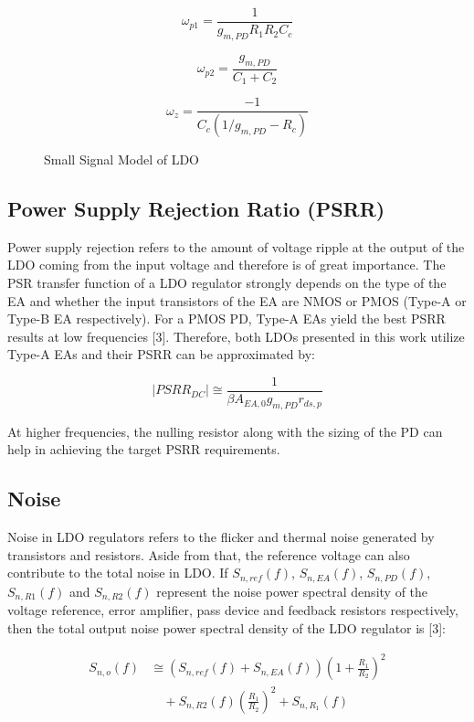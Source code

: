 \documentclass[journal]{IEEEtran}
\newcommand{\svg}[3]{
    \begin{figure}[!h]
        \centering
        
        \caption{#2}
    \end{figure}
}
\begin{document}
\begin{equation}
    \omega_{p1} = \frac{1}{g_{m,PD} R_1 R_2 C_c}
\end{equation}

\begin{equation}
    \omega_{p2} = \frac{g_{m,PD}}{C_1 + C_2}
\end{equation}

\begin{equation}
    \omega_{z} = \frac{-1}{C_c(1 \slash g_{m,PD} - R_c)}
\end{equation}

\svg{../images/pmos_ldo_ss.svg}{Small Signal Model of LDO}{1}

\subsection{Power Supply Rejection Ratio (PSRR)}
Power supply rejection refers to the amount of voltage ripple at the output of the LDO coming from the input voltage and therefore is of great importance. The PSR transfer function of a LDO regulator strongly depends on the type of the EA and whether the input transistors of the EA are NMOS or PMOS (Type-A or Type-B EA respectively). For a PMOS PD, Type-A EAs yield the best PSRR results at low frequencies [3]. Therefore, both LDOs presented in this work utilize Type-A EAs and their PSRR can be approximated by:

\begin{equation}
    |PSRR_{DC}| \cong \frac{1}{\beta A_{EA,0} g_{m,PD} r_{ds,p}}
\end{equation}

At higher frequencies, the nulling resistor along with the sizing of the PD can help in achieving the target PSRR requirements.

\subsection{Noise}
Noise in LDO regulators refers to the flicker and thermal noise generated by transistors and resistors. Aside from that, the reference voltage can also contribute to the total noise in LDO. If $S_{n,ref}(f)$, $S_{n,EA}(f)$, $S_{n,PD}(f)$, $S_{n,R1}(f)$ and $S_{n,R2}(f)$ represent the noise power spectral density of the voltage reference, error amplifier, pass device and feedback resistors respectively, then the total output noise power spectral density of the LDO regulator is [3]:

\begin{equation}
    \begin{aligned}
        S_{n,o}(f) &\cong (S_{n,ref}(f)+S_{n,EA}(f))\left(1+\frac{R_1}{R_2}\right)^2 \\
        &\quad +S_{n,R2}(f)(\frac{R_1}{R_2})^2+S_{n,R_1}(f)
    \end{aligned}
\end{equation}
\end{document}
